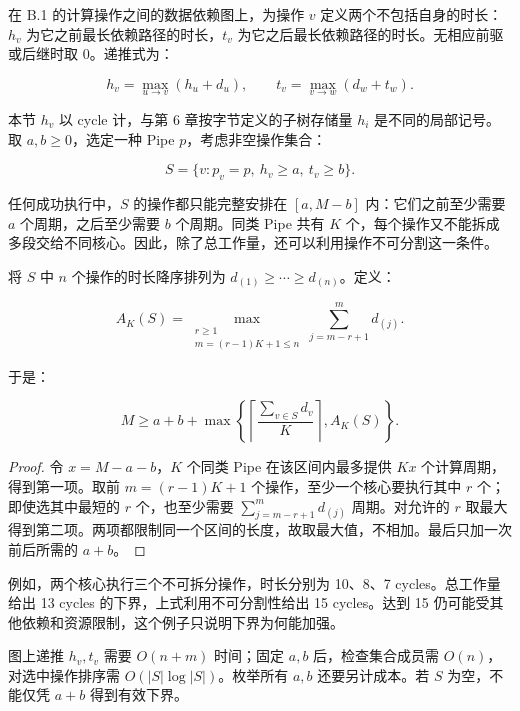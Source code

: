 \documentclass[anonymous,notoc]{gmcm2026}
\begin{document}
在 B.1 的计算操作之间的数据依赖图上，为操作 \(v\) 定义两个不包括自身的时长：\(h_v\) 为它之前最长依赖路径的时长，\(t_v\) 为它之后最长依赖路径的时长。无相应前驱或后继时取 0。递推式为：

\begin{equation}
h_v = \max_{u \to v}(h_u + d_u), \qquad t_v = \max_{v \to w}(d_w + t_w).
\end{equation}

本节 \(h_v\) 以 cycle 计，与第 6 章按字节定义的子树存储量 \(h_i\) 是不同的局部记号。取 \(a, b \ge 0\)，选定一种 Pipe \(p\)，考虑非空操作集合：

\begin{equation}
S = \{v: p_v = p, \ h_v \ge a, \ t_v \ge b\}.
\end{equation}

任何成功执行中，\(S\) 的操作都只能完整安排在 \([a, M - b]\) 内：它们之前至少需要 \(a\) 个周期，之后至少需要 \(b\) 个周期。同类 Pipe 共有 \(K\) 个，每个操作又不能拆成多段交给不同核心。因此，除了总工作量，还可以利用操作不可分割这一条件。

将 \(S\) 中 \(n\) 个操作的时长降序排列为 \(d_{(1)} \ge \cdots \ge d_{(n)}\)。定义：

\begin{equation}
A_K(S) = \max_{\substack{r \ge 1 \\ m = (r-1)K+1 \le n}} \sum_{j=m-r+1}^{m} d_{(j)}.
\end{equation}

于是：

\begin{equation}
M \ge a + b + \max\left\{\left\lceil\frac{\sum_{v \in S} d_v}{K}\right\rceil, A_K(S)\right\}.
\end{equation}

\begin{proof} 令 \(x = M - a - b\)，\(K\) 个同类 Pipe 在该区间内最多提供 \(Kx\) 个计算周期，得到第一项。取前 \(m = (r-1)K + 1\) 个操作，至少一个核心要执行其中 \(r\) 个；即使选其中最短的 \(r\) 个，也至少需要 \(\sum_{j=m-r+1}^{m} d_{(j)}\) 周期。对允许的 \(r\) 取最大得到第二项。两项都限制同一个区间的长度，故取最大值，不相加。最后只加一次前后所需的 \(a + b\)。 \end{proof}

例如，两个核心执行三个不可拆分操作，时长分别为 10、8、7 cycles。总工作量给出 13 cycles 的下界，上式利用不可分割性给出 15 cycles。达到 15 仍可能受其他依赖和资源限制，这个例子只说明下界为何能加强。

图上递推 \(h_v, t_v\) 需要 \(O(n + m)\) 时间；固定 \(a, b\) 后，检查集合成员需 \(O(n)\)，对选中操作排序需 \(O(|S| \log |S|)\)。枚举所有 \(a, b\) 还要另计成本。若 \(S\) 为空，不能仅凭 \(a + b\) 得到有效下界。
\end{document}
